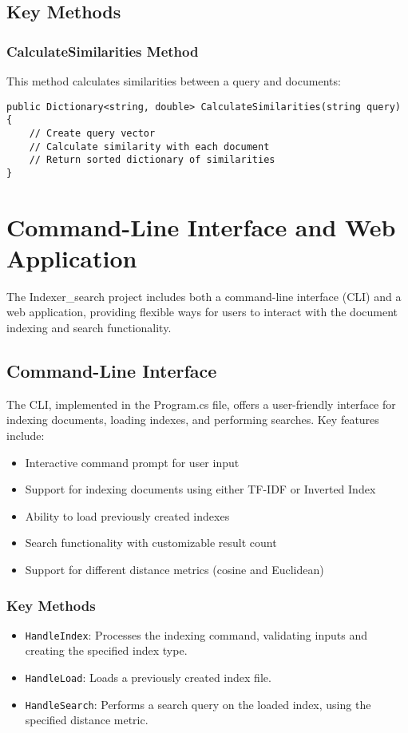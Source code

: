 \documentclass{article}
\begin{document}
\subsection{Key Methods}
\subsubsection{CalculateSimilarities Method}
This method calculates similarities between a query and documents:

\begin{lstlisting}
public Dictionary<string, double> CalculateSimilarities(string query)
{
    // Create query vector
    // Calculate similarity with each document
    // Return sorted dictionary of similarities
}
\end{lstlisting}

\section{Command-Line Interface and Web Application}

The Indexer\_search project includes both a command-line interface (CLI) and a web application, providing flexible ways for users to interact with the document indexing and search functionality.

\subsection{Command-Line Interface}

The CLI, implemented in the Program.cs file, offers a user-friendly interface for indexing documents, loading indexes, and performing searches. Key features include:

\begin{itemize}
    \item Interactive command prompt for user input
    \item Support for indexing documents using either TF-IDF or Inverted Index
    \item Ability to load previously created indexes
    \item Search functionality with customizable result count
    \item Support for different distance metrics (cosine and Euclidean)
\end{itemize}

\subsubsection{Key Methods}
\begin{itemize}
    \item \texttt{HandleIndex}: Processes the indexing command, validating inputs and creating the specified index type.
    \item \texttt{HandleLoad}: Loads a previously created index file.
    \item \texttt{HandleSearch}: Performs a search query on the loaded index, using the specified distance metric.
\end{itemize}
\end{document}
